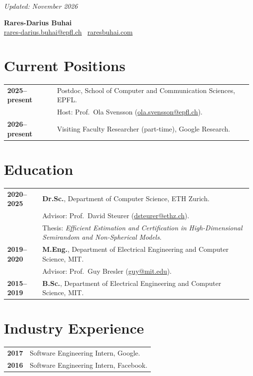 \documentclass[11pt,a4paper]{article}
\begin{document}
\begin{flushright}
  \small\emph{Updated: November 2026}
\end{flushright}
\begin{center}
  {\LARGE \textbf{Rares-Darius Buhai}}\\[0.23em]
  \href{mailto:rares-darius.buhai@epfl.ch}{rares-darius.buhai@epfl.ch} \textbar\ 
  \href{https://raresbuhai.com}{raresbuhai.com}
\end{center}

\section*{Current Positions}
\begin{tabularx}{\textwidth}{@{}p{}@{}X@{}}
  \textbf{2025--present} & Postdoc, School of Computer and Communication Sciences, EPFL.\\
                         & Host: Prof.\ Ola Svensson (\href{mailto:ola.svensson@epfl.ch}{ola.svensson@epfl.ch}).\\[0.6em]
  \textbf{2026--present} & Visiting Faculty Researcher (part-time), Google Research.\\[0.6em]
\end{tabularx}

\section*{Education}
\begin{tabularx}{\textwidth}{@{}p{}@{}X@{}}
  \textbf{2020--2025} & \textbf{Dr.Sc.}, Department of Computer Science, ETH Zurich.\\
                      & Advisor: Prof.\ David Steurer (\href{mailto:dsteurer@ethz.ch}{dsteurer@ethz.ch}).\\
                      & Thesis: \emph{Efficient Estimation and Certification in High-Dimensional Semirandom and Non-Spherical Models}.\\[0.6em]
  \textbf{2019--2020} & \textbf{M.Eng.}, Department of Electrical Engineering and Computer Science, MIT.\\
                      & Advisor: Prof.\ Guy Bresler (\href{mailto:guy@mit.edu}{guy@mit.edu}).\\[0.6em]
  \textbf{2015--2019} & \textbf{B.Sc.}, Department of Electrical Engineering and Computer Science, MIT.
\end{tabularx}

\section*{Industry Experience}
\begin{tabularx}{\textwidth}{@{}p{}@{}X@{}}
  \textbf{2017} & Software Engineering Intern, Google.\\[0.4em]
  \textbf{2016} & Software Engineering Intern, Facebook.
\end{tabularx}
\end{document}
